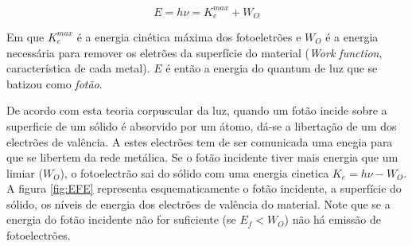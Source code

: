 \documentclass[a4paper,12pt]{article}  %
\begin{document}
\begin{equation}
	\label{eq:energia2}
	E = h \nu = K_e^{max} + W_O
\end{equation}

Em que $K_e^{max}$ é a energia cinética máxima dos fotoeletrões  e $W_O$ é a energia necessária para remover os eletrões da superfície do material (\emph{Work function}, característica de cada metal). $E$ é então a energia do quantum de luz que se batizou como \emph{fotão}.

De acordo com esta teoria corpuscular da luz, quando um fotão incide sobre a superficie  de um sólido  é absorvido por um átomo, dá-se a libertação de um dos electrões de valência. A estes electrões tem de ser comunicada uma enegia 
 para que se libertem da rede metálica. Se o fotão incidente tiver mais energia que um limiar ($W_O$), o fotoelectrão sai do sólido com uma energia cinetica $K_e = h\nu - W_O$.
A figura \ref{fig:EFE}   representa esquematicamente o fotão incidente, a superfície do sólido, os níveis de energia dos electrões de valência do material. Note que se a energia do fotão incidente não for suficiente (se $E_f < W_O$) não há emissão de fotoelectrões.
\end{document}
